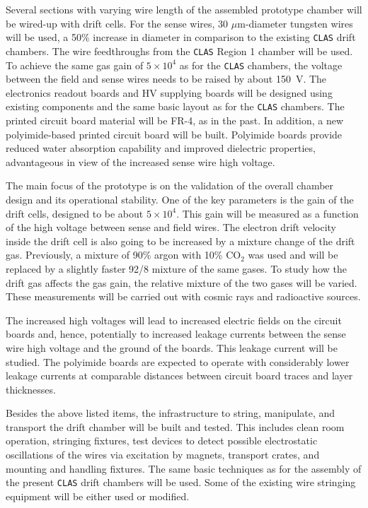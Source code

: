 Several sections with varying wire length of the assembled prototype chamber
will be wired-up with drift cells.  For the sense wires, 30 $\mu$m-diameter 
tungsten wires will be used, a 50\% increase in diameter in comparison to the 
existing {\tt CLAS} drift chambers.  The wire feedthroughs from the {\tt CLAS} 
Region 1 chamber will be used.  To achieve the same gas gain of $5 \times 10^4$ 
as for the {\tt CLAS} chambers, the voltage between the field and sense wires 
needs to be raised by about 150~V.  The electronics readout boards and HV 
supplying boards will be designed using existing components and the same basic 
layout as for the {\tt CLAS} chambers.  The printed circuit board material will 
be FR-4, as in the past.  In addition, a new polyimide-based printed circuit 
board will be built.  Polyimide boards provide reduced water absorption 
capability and improved dielectric properties, advantageous in view of the 
increased sense wire high voltage.

The main focus of the prototype is on the validation of the overall chamber 
design and its operational stability.  One of the key parameters is the gain 
of the drift cells, designed to be about $5 \times 10^4$. This gain will be 
measured as a function of the high voltage between sense and field wires.
The electron drift velocity inside the drift cell is also going to be increased 
by a mixture change of the drift gas.  Previously, a mixture of 90\% argon with 
10\% CO$_2$ was used and will be replaced by a slightly faster 92/8 mixture of 
the same gases.  To study how the drift gas affects the gas gain, the relative 
mixture of the two gases will be varied.  These measurements will be carried 
out with cosmic rays and radioactive sources. 

The increased high voltages will lead to increased electric fields on the circuit
boards and, hence, potentially to increased leakage currents between the sense 
wire high voltage and the ground of the boards. This leakage current will be 
studied.  The polyimide boards are expected to operate with considerably lower 
leakage currents at comparable distances between circuit board traces and layer 
thicknesses.

Besides the above listed items, the infrastructure to string, manipulate, and 
transport the drift chamber will be built and tested.  This includes clean room 
operation, stringing fixtures, test devices to detect possible electrostatic 
oscillations of the wires via excitation by magnets, transport crates, and 
mounting and handling fixtures.  The same basic techniques as for the assembly 
of the present {\tt CLAS} drift chambers will be used.  Some of the existing 
wire stringing equipment will be either used or modified.

